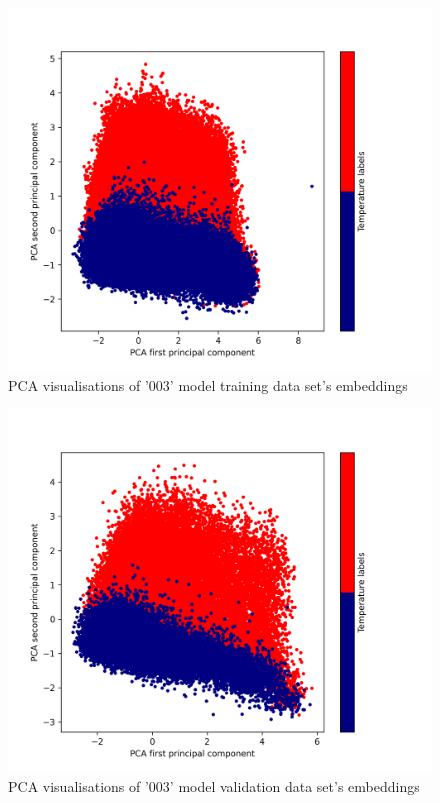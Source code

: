 \documentclass[12pt]{article}
\begin{document}
	\begin{figure}[h!]
		\centering
		\includegraphics[scale=0.65]{003_train_v2_PCA.png}

		\caption{PCA visualisations of '003' model training
		data set's embeddings}
		\label{figure:trainingScikitPCAembeddings003}
	\end{figure}

	\begin{figure}[h!]
		\centering
		\includegraphics[scale=0.65]{003_validate_v2_PCA.png}

		\caption{PCA visualisations of '003' model validation
		data set's embeddings}
		\label{figure:validationScikitPCAembeddings003}
	\end{figure}
\end{document}
